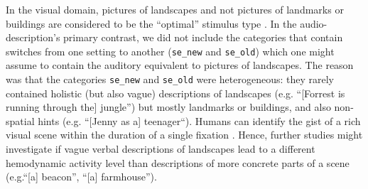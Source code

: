 \documentclass[english,11pt]{article}
\begin{document}
In the visual domain, pictures of landscapes and not pictures of landmarks or
buildings are considered to be the ``optimal'' stimulus type
\citep{epstein2008parahippocampal}.
In the audio-description's primary contrast, we did not include the categories
that contain switches from one setting to another (\texttt{se\_new} and
\texttt{se\_old}) which one might assume to contain the auditory equivalent to
pictures of landscapes.
The reason was that the categories \texttt{se\_new} and \texttt{se\_old} were
heterogeneous: they rarely contained holistic (but also vague) descriptions of
landscapes (e.g.  ``[Forrest is running through the] jungle'') but mostly
landmarks or buildings, and also non-spatial hints (e.g. ``[Jenny as a]
teenager``).
Humans can identify the gist of a rich visual scene within the duration of a
single fixation \citep{henderson2003human}.
%
Hence, further studies might investigate if vague verbal descriptions of
landscapes lead to a different hemodynamic activity level than descriptions of
more concrete parts of a scene (e.g.``[a] beacon'', ``[a] farmhouse'').


\end{document}
